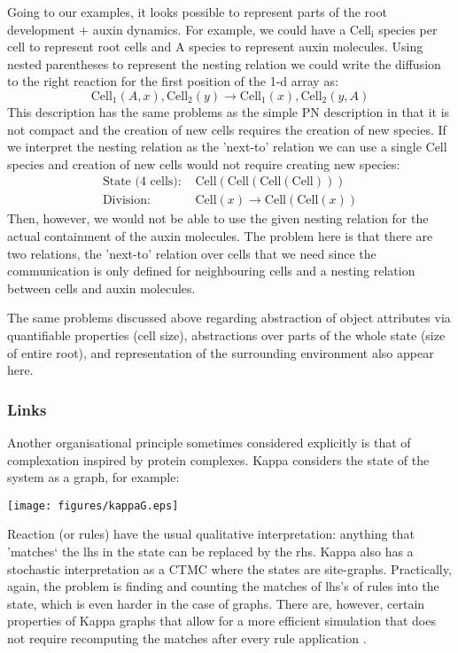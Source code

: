 Going to our examples, it looks possible to represent parts of the root
development + auxin dynamics. For example, we could have a $\mathrm{Cell_i}$
species per cell to represent root cells and $\mathrm{A}$ species to represent auxin
molecules. Using nested parentheses to represent the nesting relation we could
write the diffusion to the right reaction for the first position of the 1-d
array as:
$$
\mathrm{Cell_1}(A, x), \mathrm{Cell_2}(y) \rightarrow \mathrm{Cell_1}(x), \mathrm{Cell_2}(y, A)
$$
This description has the same problems as the simple PN description in that it is
not compact and the creation of new cells requires the creation of new
species. If we interpret the nesting relation as the 'next-to' relation we
can use a single $\mathrm{Cell}$ species and creation of new cells would not
require creating new species:
\begin{align*}
  \text{State (4 cells): } & \mathrm{Cell(Cell(Cell(Cell)))} \\
  \text{Division: } & \mathrm{Cell}(x) \rightarrow \mathrm{Cell}(\mathrm{Cell}(x))
\end{align*}
Then, however, we would not be able to use the given nesting relation for the
actual containment of the auxin molecules. The problem here is that there are
two relations, the 'next-to' relation over cells that we need since the
communication is only defined for neighbouring cells and a nesting relation
between cells and auxin molecules.

The same problems discussed above regarding abstraction of object attributes via
quantifiable properties (\eg cell size), abstractions over parts of the whole
state (\eg size of entire root), and representation of the surrounding
environment also appear here.

\subsubsection*{Links}
Another organisational principle sometimes considered explicitly is that of
complexation inspired by protein complexes. Kappa \citep{danos_formal_2004}
considers the state of the system as a graph, for example:
\begin{center}
    \texttt{[image: figures/kappaG.eps]}
  \end{center}
Reaction (or rules) have the usual qualitative interpretation: anything that
'matches` the lhs in the state can be replaced by the rhs. Kappa
also has a stochastic interpretation as a CTMC where the states are
site-graphs. Practically, again, the problem is finding and counting the matches
of lhs's of rules into the state, which is even harder in the case of
graphs. There are, however, certain properties of Kappa graphs that
allow for a more efficient simulation that does not require recomputing the
matches after every rule application \citep{danos_scalable_2007}.
  
